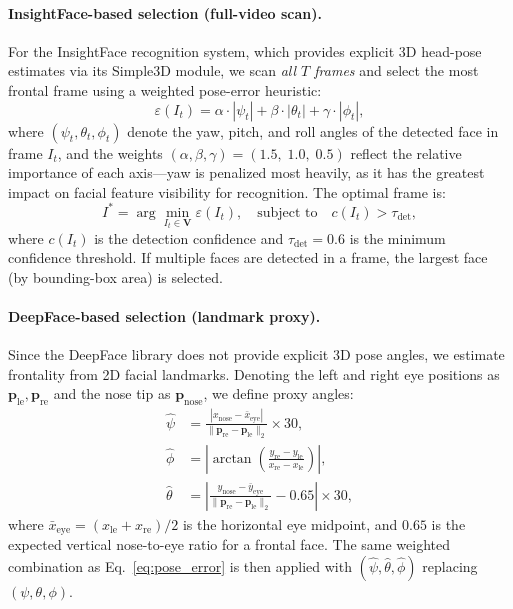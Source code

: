 \paragraph{InsightFace-based selection (full-video scan).}
For the InsightFace recognition system, which provides explicit
3D head-pose estimates via its Simple3D module, we scan
\emph{all $T$ frames} and select the most frontal frame using
a weighted pose-error heuristic:
\begin{equation}
    \varepsilon(I_t) = \alpha \cdot |\psi_t|
                     + \beta  \cdot |\theta_t|
                     + \gamma \cdot |\phi_t|,
    \label{eq:pose_error}
\end{equation}
where $(\psi_t, \theta_t, \phi_t)$ denote the yaw, pitch, and
roll angles of the detected face in frame $I_t$, and the weights
$(\alpha, \beta, \gamma) = (1.5,\; 1.0,\; 0.5)$ reflect the
relative importance of each axis---yaw is penalized most
heavily, as it has the greatest impact on facial feature visibility
for recognition.  The optimal frame is:
\begin{equation}
    I^{*} = \arg\min_{I_t \in \mathbf{V}} \varepsilon(I_t),
    \quad \text{subject to} \quad
    c(I_t) > \tau_{\text{det}},
    \label{eq:optimal_frame}
\end{equation}
where $c(I_t)$ is the detection confidence and
$\tau_{\text{det}} = 0.6$ is the minimum confidence threshold.
If multiple faces are detected in a frame, the largest face
(by bounding-box area) is selected.

\paragraph{DeepFace-based selection (landmark proxy).}
Since the DeepFace library does not provide explicit 3D pose
angles, we estimate frontality from 2D facial landmarks.
Denoting the left and right eye positions as
$\mathbf{p}_{\text{le}}, \mathbf{p}_{\text{re}}$ and the nose
tip as $\mathbf{p}_{\text{nose}}$, we define proxy angles:
\begin{align}
    \hat{\psi} &= \frac{|x_{\text{nose}} - \bar{x}_{\text{eye}}|}
                       {\|\mathbf{p}_{\text{re}} - \mathbf{p}_{\text{le}}\|_2}
                  \times 30,
    \label{eq:proxy_yaw} \\[3pt]
    \hat{\phi} &= \left|\arctan\!\left(
                  \frac{y_{\text{re}} - y_{\text{le}}}
                       {x_{\text{re}} - x_{\text{le}}}
                  \right)\right|,
    \label{eq:proxy_roll} \\[3pt]
    \hat{\theta} &= \left|
                    \frac{y_{\text{nose}} - \bar{y}_{\text{eye}}}
                         {\|\mathbf{p}_{\text{re}} - \mathbf{p}_{\text{le}}\|_2}
                    - 0.65
                    \right| \times 30,
    \label{eq:proxy_pitch}
\end{align}
where $\bar{x}_{\text{eye}} = (x_{\text{le}} + x_{\text{re}})/2$
is the horizontal eye midpoint, and $0.65$ is the expected
vertical nose-to-eye ratio for a frontal face.  The same weighted
combination as Eq.~\eqref{eq:pose_error} is then applied with
$(\hat{\psi}, \hat{\theta}, \hat{\phi})$ replacing
$(\psi, \theta, \phi)$.

